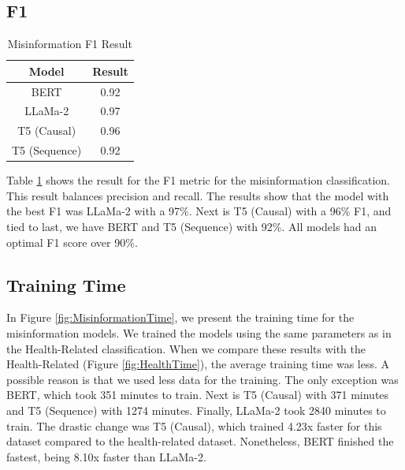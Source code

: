 \subsection{F1}
\begin{table}[H]
	\centering
	\caption{Misinformation F1 Result}
	\begin{tabular}{||c | c||} 
		\hline
		\textbf{Model} & \textbf{Result} \\ [0.5ex] 
		\hline
		BERT & 0.92  \\
		\hline
		LLaMa-2 & 0.97 \\ 
		\hline
		T5 (Causal) & 0.96 \\
		\hline
		T5 (Sequence) & 0.92 \\
		\hline
	\end{tabular}
	\label{table:MisinformationF1}
\end{table}


Table \ref{table:MisinformationF1}  shows the result for the F1 metric for the misinformation classification. This result balances precision and recall. The results show that the model
with the best F1 was LLaMa-2 with a 97\%. Next is T5 (Causal) with a 96\% F1, and tied to last, we have BERT and T5 (Sequence) with 92\%. All models had an optimal F1 score over 90\%.


\subsection{Training Time}

In Figure \ref{fig:MisinformationTime}, we present the training time for the misinformation models. We trained the models using the same parameters as in the Health-Related classification.
When we compare these results with the Health-Related (Figure \ref{fig:HealthTime}), the average training time was less. A possible reason is that we used less data for the training. The
only exception was BERT, which took 351 minutes to train. Next is T5 (Causal) with 371 minutes and T5 (Sequence) with 1274 minutes. Finally, LLaMa-2 took 2840 minutes to train. The
drastic change was T5 (Causal), which trained 4.23x faster for this dataset compared to the health-related dataset. Nonetheless, BERT finished the fastest, being 8.10x faster than LLaMa-2.


